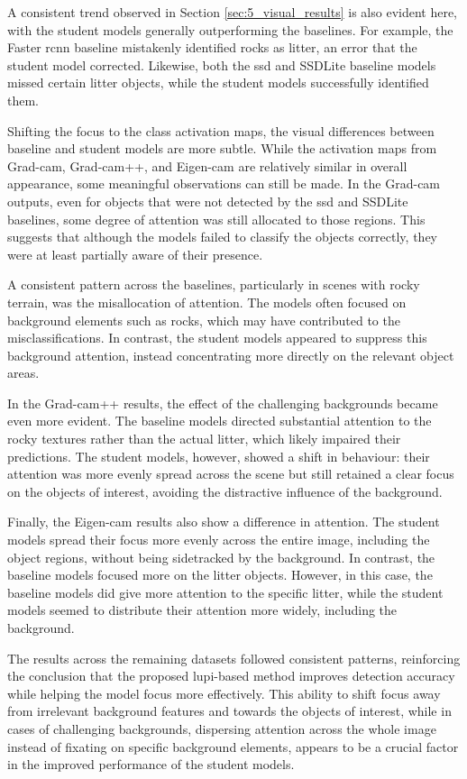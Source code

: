 A consistent trend observed in Section \ref{sec:5_visual_results} is also evident here, with the student models generally outperforming the baselines. For example, the Faster \gls{rcnn} baseline mistakenly identified rocks as litter, an error that the student model corrected. Likewise, both the \gls{ssd} and SSDLite baseline models missed certain litter objects, while the student models successfully identified them.

Shifting the focus to the class activation maps, the visual differences between baseline and student models are more subtle. While the activation maps from Grad-\gls{cam}, Grad-\gls{cam}++, and Eigen-\gls{cam} are relatively similar in overall appearance, some meaningful observations can still be made. In the Grad-\gls{cam} outputs, even for objects that were not detected by the \gls{ssd} and SSDLite baselines, some degree of attention was still allocated to those regions. This suggests that although the models failed to classify the objects correctly, they were at least partially aware of their presence.

A consistent pattern across the baselines, particularly in scenes with rocky terrain, was the misallocation of attention. The models often focused on background elements such as rocks, which may have contributed to the misclassifications. In contrast, the student models appeared to suppress this background attention, instead concentrating more directly on the relevant object areas.

In the Grad-\gls{cam}++ results, the effect of the challenging backgrounds became even more evident. The baseline models directed substantial attention to the rocky textures rather than the actual litter, which likely impaired their predictions. The student models, however, showed a shift in behaviour: their attention was more evenly spread across the scene but still retained a clear focus on the objects of interest, avoiding the distractive influence of the background.

Finally, the Eigen-\gls{cam} results also show a difference in attention. The student models spread their focus more evenly across the entire image, including the object regions, without being sidetracked by the background. In contrast, the baseline models focused more on the litter objects. However, in this case, the baseline models did give more attention to the specific litter, while the student models seemed to distribute their attention more widely, including the background.

The results across the remaining datasets followed consistent patterns, reinforcing the conclusion that the proposed \gls{lupi}-based method improves detection accuracy while helping the model focus more effectively. This ability to shift focus away from irrelevant background features and towards the objects of interest, while in cases of challenging backgrounds, dispersing attention across the whole image instead of fixating on specific background elements, appears to be a crucial factor in the improved performance of the student models.


